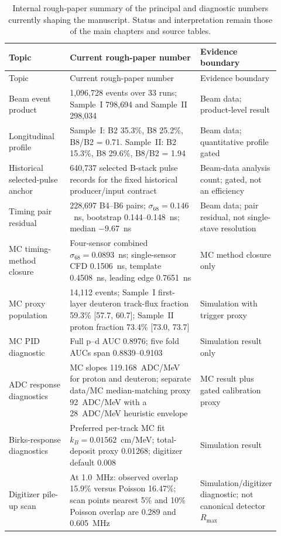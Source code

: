 \small
\begin{longtable}{p{0.23\linewidth}p{0.52\linewidth}p{0.17\linewidth}}
\caption{Internal rough-paper summary of the principal and diagnostic numbers currently shaping the manuscript. Status and interpretation remain those of the main chapters and source tables.}\\
\toprule
Topic & Current rough-paper number & Evidence boundary \\
\midrule
\endfirsthead
\toprule
Topic & Current rough-paper number & Evidence boundary \\
\midrule
\endhead
Beam event product & 1{,}096{,}728 events over 33 runs; Sample~I 798{,}694 and Sample~II 298{,}034 & Beam data; product-level result \\
Longitudinal profile & Sample~I: B2 35.3\%, B8 25.2\%, B8/B2 = 0.71. Sample~II: B2 15.3\%, B8 29.6\%, B8/B2 = 1.94 & Beam data; quantitative profile gated \\
Historical selected-pulse anchor & 640{,}737 selected B-stack pulse records for the fixed historical producer/input contract & Beam-data analysis count; gated, not an efficiency \\
Timing pair residual & 228{,}697 B4--B6 pairs; $\sigma_{68}=0.146$~ns, bootstrap 0.144--0.148~ns; median $-9.67$~ns & Beam data; pair residual, not single-stave resolution \\
MC timing-method closure & Four-sensor combined $\sigma_{68}=0.0893$~ns; single-sensor CFD 0.1506~ns, template 0.4508~ns, leading edge 0.7651~ns & MC method closure only \\
MC proxy population & 14{,}112 events; Sample~I first-layer deuteron track-flux fraction 59.3\% [57.7, 60.7]; Sample~II proton fraction 73.4\% [73.0, 73.7] & Simulation with trigger proxy \\
MC PID diagnostic & Full p--d AUC 0.8976; five fold AUCs span 0.8839--0.9103 & Simulation result only \\
ADC response diagnostics & MC slopes 119.168~ADC/MeV for proton and deuteron; separate data/MC median-matching proxy 92~ADC/MeV with a 28~ADC/MeV heuristic envelope & MC result plus gated calibration proxy \\
Birks-response diagnostics & Preferred per-track MC fit $k_B=0.01562$~cm/MeV; total-deposit proxy 0.01268; digitizer default 0.008 & Simulation result \\
Digitizer pile-up scan & At 1.0~MHz: observed overlap 15.9\% versus Poisson 16.47\%; scan points nearest 5\% and 10\% Poisson overlap are 0.289 and 0.605~MHz & Simulation/digitizer diagnostic; not canonical detector $R_{\max}$ \\

\end{longtable}
